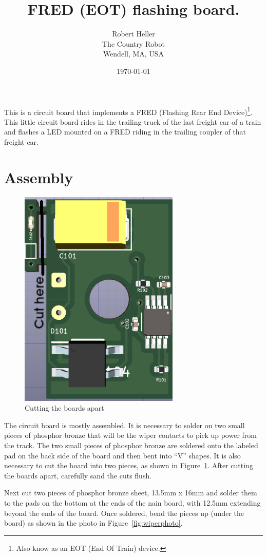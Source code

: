 \documentclass[12pt,twoside,letterpaper]{article}
\title{FRED (EOT) flashing board.}
\author{Robert Heller \\ The Country Robot \\ Wendell, MA, USA}
\date{\today}
\begin{document}
\maketitle

This is a circuit board that implements a FRED (Flashing Rear End 
Device)\footnote{Also know as an EOT (End Of Train) device.}. This little 
circuit board rides in the trailing truck of the last freight car of a train 
and flashes a LED mounted on a FRED riding in the trailing coupler of that 
freight car.

\section{Assembly}

\begin{figure}[hbpt]\begin{centering}%
\includegraphics[width=3in]{FRED_Board3D_Top_cut.png}
\caption{Cutting the boards apart}
\label{fig:boardcut}
\end{centering}\end{figure}
The circuit board is mostly assembled.  It is necessary to solder on two small 
pieces of phosphor bronze that will be the wiper contacts to pick up power 
from the track. The two small pieces of phosphor bronze are soldered onto the 
labeled pad on the back side of the board and then bent into ``V'' shapes. It 
is also necessary to cut the board into two pieces, as shown in 
Figure~\ref{fig:boardcut}. After cutting the boards apart, carefully sand the 
cuts flush.

Next cut two pieces of phosphor bronze sheet, 13.5mm x 16mm and solder them to 
the pads on the bottom at the ends of the nain board, with 12.5mm extending 
beyond the ends of the board.  Once soldered, bend the pieces up (under the 
board) as shown in the photo in Figure~\ref{fig:wiperphoto}.
\end{document}
